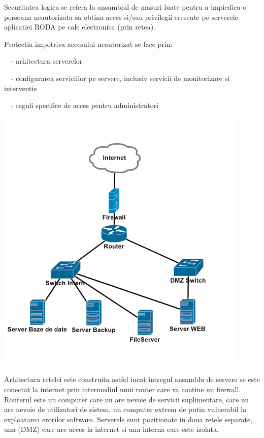 {\sffamily\color{black}
Securitatea logica se refera la ansamblul de masuri luate pentru a impiedica o persoana neautorizata sa obtina acces
si/sau privilegii crescute pe serverele aplicatiei RODA pe cale electronica (prin retea). }


\bigskip

{\sffamily\color{black}
Protectia impotriva accesului neautorizat se face prin:}


\bigskip

{\sffamily\color{black}
\ \ {}- arhitectura serverelor}

{\sffamily\color{black}
\ \ {}- configurarea serviciilor pe servere, inclusiv servicii de monitorizare si interventie }

{\sffamily\color{black}
\ \ {}- reguli specifice de acces pentru administratori}


\bigskip

\includegraphics[width=4.75in,height=5.0626in]{SecuritateaarhiveiRODA-img002.png}

{\sffamily\color{black}
Arhitectura retelei este construita astfel incat intregul ansamblu de servere se este conectat la internet prin
intermediul unui router care va contine un firewall. Routerul este un computer care nu are nevoie de servicii
suplimentare, care nu are nevoie de utilizatori de sistem, un computer extrem de putin vulnerabil la exploatarea
erorilor software. Serverele sunt pozitionate in doua retele separate, una (DMZ) care are acces la internet si una
interna care este izolata.}

